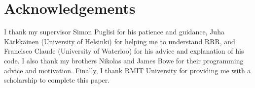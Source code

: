 \section{Acknowledgements}

I thank my supervisor Simon Puglisi for his patience and guidance,
Juha K\"{a}rkk\"{a}inen (University of Helsinki) for helping me to understand 
RRR, and Francisco Claude (University of Waterloo) for his advice and 
explanation of his code. I also thank my brothers Nikolas and James Bowe for 
their programming advice and motivation. Finally, I thank RMIT University
for providing me with a scholarship to complete this paper.
